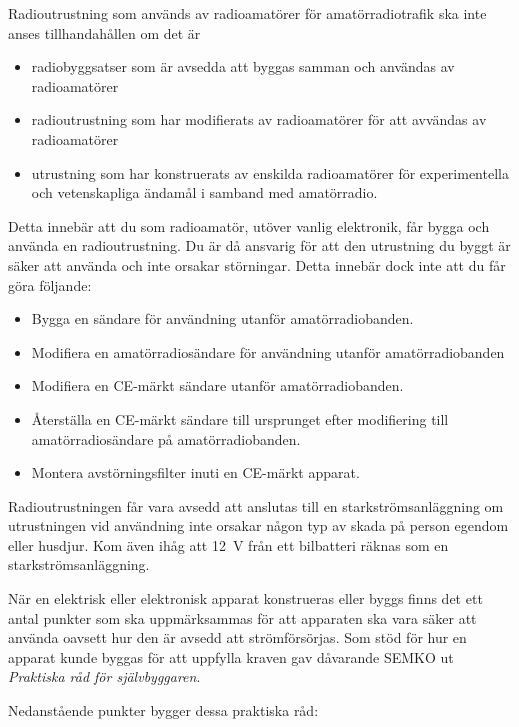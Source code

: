 Radioutrustning som används av radioamatörer för amatörradiotrafik ska inte
anses tillhandahållen om det är
\begin{itemize}

  \item radiobyggsatser som är avsedda att byggas samman och användas av
  radioamatörer
  \item radioutrustning som har modifierats av radioamatörer för att
  avvändas av radioamatörer
  \item utrustning som har konstruerats av enskilda radioamatörer för
  experimentella och vetenskapliga ändamål i samband med amatörradio.
\end{itemize}

Detta innebär att du som radioamatör, utöver vanlig elektronik, får bygga
och använda en radioutrustning.
Du är då ansvarig för att den utrustning du byggt är säker att använda och inte
orsakar störningar.
Detta innebär dock inte att du får göra följande:

\begin{itemize}

  \item Bygga en sändare för användning utanför amatörradiobanden.
  \item Modifiera en amatörradiosändare för användning utanför amatörradiobanden
  \item Modifiera en CE-märkt sändare utanför amatörradiobanden.
  \item Återställa en CE-märkt sändare till ursprunget efter modifiering till
    amatörradiosändare på amatörradiobanden.
  \item Montera avstörningsfilter inuti en CE-märkt apparat.
\end{itemize}


Radioutrustningen får vara avsedd att anslutas till en starkströmsanläggning
om utrustningen vid användning inte orsakar någon typ av skada på person
egendom eller husdjur.
Kom även ihåg att 12~V från ett bilbatteri räknas som en starkströmsanläggning.

När en elektrisk eller elektronisk apparat konstrueras eller byggs finns det
ett antal punkter som ska uppmärksammas för att apparaten ska vara säker att
använda oavsett hur den är avsedd att strömförsörjas.
Som stöd för hur en apparat kunde byggas för att uppfylla kraven gav
dåvarande SEMKO ut \emph{Praktiska råd för självbyggaren}.

Nedanstående punkter bygger dessa praktiska råd:

